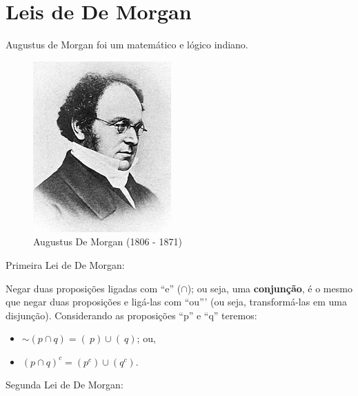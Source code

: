 \documentclass[
]{book}
\providecommand{\tightlist}{%
  \setlength{\itemsep}{0pt}\setlength{\parskip}{0pt}}
\begin{document}
\hypertarget{leis-de-de-morgan}{%
\section{Leis de De Morgan}\label{leis-de-de-morgan}}

Augustus de Morgan foi um matemático e lógico indiano.

\hfill\break

\begin{figure}

{\centering \includegraphics[width=0.5\linewidth]{images4/de_morgan} 

}

\caption{Augustus De Morgan (1806 - 1871)}\label{fig:unnamed-chunk-26}
\end{figure}

\hfill\break

Primeira Lei de De Morgan:

\hfill\break

Negar duas proposições ligadas com ``e'' (\(\cap\)); ou seja, uma \textbf{conjunção}, é o mesmo que negar duas proposições e ligá-las com ``ou''' (ou seja, transformá-las em uma disjunção). Considerando as proposições ``p'' e ``q'' teremos:

\hfill\break

\begin{itemize}
\tightlist
\item
  \(\sim (p \cap q) = (~p) \cup (~q)\); ou,\\
\item
  \((p \cap q)^{c} = (p^{c}) \cup (q^{c})\).
\end{itemize}

\hfill\break

Segunda Lei de De Morgan:
\end{document}

